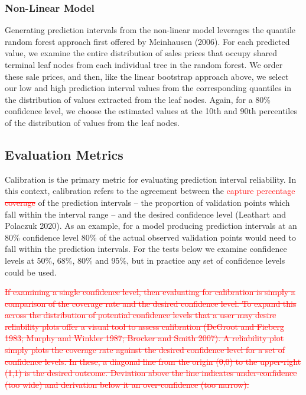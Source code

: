 \documentclass[colTwo]{anon}
\theoremstyle{definition}
\begin{document}
\subsubsection{Non-Linear Model}

Generating prediction intervals from the non-linear model leverages the quantile random forest approach first offered by Meinhausen (2006).  For each predicted value, we examine the entire distribution of sales prices that occupy shared terminal leaf nodes from each individual tree in the random forest.  We order these sale prices, and then, like the linear bootstrap approach above, we select our low and high prediction interval values from the corresponding quantiles in the distribution of values extracted from the leaf nodes. Again, for a 80\% confidence level, we choose the estimated values at the 10th and 90th percentiles of the distribution of values from the leaf nodes. 

\subsection{Evaluation Metrics}

Calibration is the primary metric for evaluating prediction interval reliability.  In this context, calibration refers to the agreement between the \textcolor{red}{capture percentage \st{coverage}} of the prediction intervals -- the proportion of validation points which fall within the interval range -- and the desired confidence level (Leathart and Polaczuk 2020).  As an example, for a model producing prediction intervals at an 80\% confidence level 80\% of the actual observed validation points would need to fall within the prediction intervals.  For the tests below we examine confidence levels at 50\%, 68\%, 80\% and 95\%, but in practice any set of confidence levels could be used.

\textcolor{red}{ \st{If examining a single confidence level, then evaluating for calibration is simply a comparison of the coverage rate and the desired confidence level.  To expand this across the distribution of potential confidence levels that a user may desire reliability plots offer a visual tool to assess calibration (DeGroot and Fieberg 1983; Murphy and Winkler 1987; Brocker and Smith 2007).  A reliability plot simply plots the coverage rate against the desired confidence level for a set of confidence levels. In these, a diagonal line from the origin (0,0) to the upper-right (1,1) is the desired outcome.  Deviation above the line indicates under-confidence (too wide) and derivation below it an over-confidence (too narrow).}}  
\end{document}
